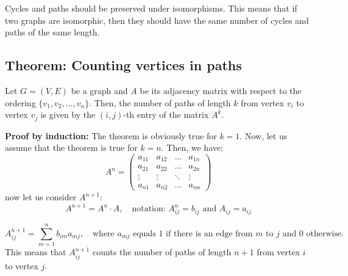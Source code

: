 \documentclass[11pt]{article}
\begin{document}
Cycles and paths should be preserved under isomorphisms. This means that if two graphs are isomorphic, then they should have the same number of cycles and paths of the same length.

\subsection{Theorem: Counting vertices in paths}
Let $G = (V,E)$ be a graph and $A$ be its adjacency matrix with respect to the ordering $\{v_1, v_2, \ldots, v_n\}$. Then, the number of paths of length $k$ from vertex $v_i$ to vertex $v_j$ is given by the $(i,j)$-th entry of the matrix $A^k$.

\textbf{Proof by induction:} The theorem is obviously true for $k = 1$. Now, let us assume that the theorem is true for $k = n$. Then, we have: 
\[
A^n = \begin{pmatrix}
    a_{11} & a_{12} & \ldots & a_{1n} \\
    a_{21} & a_{22} & \ldots & a_{2n} \\
    \vdots & \vdots & \ddots & \vdots \\
    a_{n1} & a_{n2} & \ldots & a_{nn}
\end{pmatrix}
\]
now let us consider $A^{n+1}$:
\[
A^{n+1} = A^n \cdot A, \quad \text{notation: } A^n_{ij} = b_{ij} \text{ and } A_{ij} = a_{ij}
\]

\[
A^{n+1}_{ij} = \sum_{m=1}^{n} b_{im} a_{mj},\quad \text{where } a_{mj} \text{ equals 1 if there is an edge from } m \text{ to } j \text{ and 0 otherwise.}
\]
This means that $A^{n+1}_{ij}$ counts the number of paths of length $n+1$ from vertex $i$ to vertex $j$.
\end{document}
